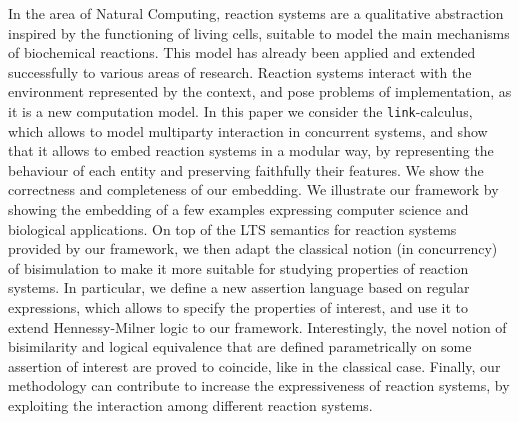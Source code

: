 
In the area of Natural Computing, reaction systems are
a qualitative abstraction inspired by the 
functioning of living cells, suitable to model the main
mechanisms of biochemical reactions.
This model has already been applied
and extended successfully to various areas of research. Reaction 
systems interact with the environment represented by the context, and
pose problems of implementation, as it is a new computation model. 
In this paper we consider the {\tt link}-calculus, which allows to model 
multiparty interaction in concurrent systems, and show that it allows to
embed reaction systems in a modular way, by representing the behaviour of each entity and
preserving faithfully their features. 
We show the correctness and completeness 
of our embedding.
We illustrate our framework by showing the embedding of 
a few examples expressing computer science
and biological applications.
On top of the LTS semantics for reaction systems provided by our framework, 
we then adapt the classical notion (in concurrency) of bisimulation
to make it more suitable for studying properties of reaction systems.
In particular, we define a new assertion language based on regular expressions, 
which allows to specify the properties of interest, and use it to extend Hennessy-Milner logic
to our framework. Interestingly, the novel notion of bisimilarity and logical equivalence that are defined parametrically on some assertion of interest are proved to coincide, like in the classical case.
Finally, our methodology can contribute to increase the expressiveness
of reaction systems, by exploiting the interaction among 
different reaction systems.
